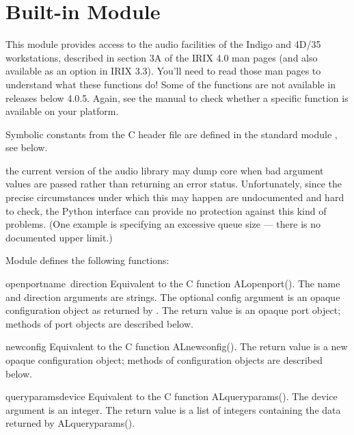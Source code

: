 \section{Built-in Module }

This module provides access to the audio facilities of the Indigo and
4D/35 workstations, described in section 3A of the IRIX 4.0 man pages
(and also available as an option in IRIX 3.3).  You'll need to read
those man pages to understand what these functions do!
Some of the functions are not available in releases below 4.0.5.
Again, see the manual to check whether a specific function is
available on your platform.

Symbolic constants from the C header file  are defined
in the standard module , see below.

 the current version of the audio library may dump core
when bad argument values are passed rather than returning an error
status.  Unfortunately, since the precise circumstances under which
this may happen are undocumented and hard to check, the Python
interface can provide no protection against this kind of problems.
(One example is specifying an excessive queue size --- there is no
documented upper limit.)

Module  defines the following functions:

\renewcommand{\indexsubitem}{(in module al)}
\begin{funcdesc}{openport}{name\, direction}
Equivalent to the C function ALopenport().  The name and direction
arguments are strings.  The optional config argument is an opaque
configuration object as returned by .  The return
value is an opaque port object; methods of port objects are described
below.
\end{funcdesc}

\begin{funcdesc}{newconfig}{}
Equivalent to the C function ALnewconfig().  The return value is a new
opaque configuration object; methods of configuration objects are
described below.
\end{funcdesc}

\begin{funcdesc}{queryparams}{device}
Equivalent to the C function ALqueryparams().  The device argument is
an integer.  The return value is a list of integers containing the
data returned by ALqueryparams().
\end{funcdesc}

